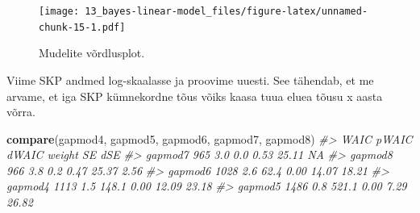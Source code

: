 \documentclass[]{book}
\newenvironment{Shaded}{\begin{snugshade}}{\end{snugshade}}
\newcommand{\KeywordTok}[1]{\textcolor[rgb]{0.13,0.29,0.53}{\textbf{#1}}}
\newcommand{\DataTypeTok}[1]{\textcolor[rgb]{0.13,0.29,0.53}{#1}}
\newcommand{\DecValTok}[1]{\textcolor[rgb]{0.00,0.00,0.81}{#1}}
\newcommand{\StringTok}[1]{\textcolor[rgb]{0.31,0.60,0.02}{#1}}
\newcommand{\CommentTok}[1]{\textcolor[rgb]{0.56,0.35,0.01}{\textit{#1}}}
\newcommand{\OperatorTok}[1]{\textcolor[rgb]{0.81,0.36,0.00}{\textbf{#1}}}
\newcommand{\NormalTok}[1]{#1}
\begin{document}
\begin{figure}
\centering
\texttt{[image: 13\_bayes-linear-model\_files/figure-latex/unnamed-chunk-15-1.pdf]}
\caption{\label{fig:unnamed-chunk-15}Mudelite võrdlusplot.}
\end{figure}

Viime SKP andmed log-skaalasse ja proovime uuesti. See tähendab, et me
arvame, et iga SKP kümnekordne tõus võiks kaasa tuua eluea tõusu x aasta
võrra.

\begin{Shaded}
\end{Shaded}

\begin{Shaded}
\begin{Highlighting}[]
\KeywordTok{compare}\NormalTok{(gapmod4, gapmod5, gapmod6, gapmod7, gapmod8)}
\CommentTok{#>         WAIC pWAIC dWAIC weight    SE   dSE}
\CommentTok{#> gapmod7  965   3.0   0.0   0.53 25.11    NA}
\CommentTok{#> gapmod8  966   3.8   0.2   0.47 25.37  2.56}
\CommentTok{#> gapmod6 1028   2.6  62.4   0.00 14.07 18.21}
\CommentTok{#> gapmod4 1113   1.5 148.1   0.00 12.09 23.18}
\CommentTok{#> gapmod5 1486   0.8 521.1   0.00  7.29 26.82}
\end{Highlighting}
\end{Shaded}
\end{document}
